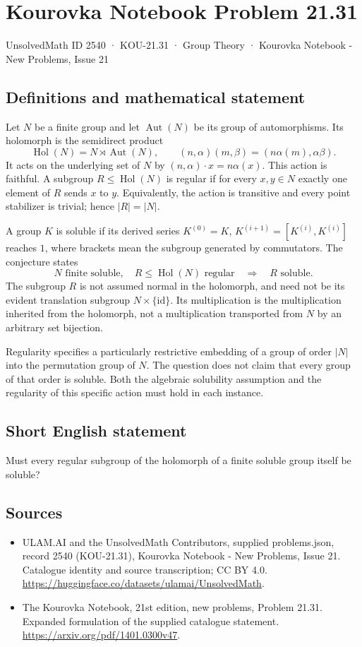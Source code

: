\documentclass[11pt,a4paper]{article}
\begin{document}
\section*{Kourovka Notebook Problem 21.31}\label{2540}
{\small UnsolvedMath ID 2540 · KOU-21.31 · Group Theory · Kourovka Notebook - New Problems, Issue 21}
\subsection{Definitions and mathematical statement}
Let $N$ be a finite group and let $\operatorname{Aut}(N)$ be its group
of automorphisms. Its holomorph is the semidirect product
\[
 \operatorname{Hol}(N)=N\rtimes\operatorname{Aut}(N),\qquad
 (n,\alpha)(m,\beta)=(n\alpha(m),\alpha\beta).
\]
It acts on the underlying set of $N$ by $(n,\alpha)\cdot x=n\alpha(x)$.
This action is faithful. A subgroup $R\le\operatorname{Hol}(N)$ is
regular if for every $x,y\in N$ exactly one element of $R$ sends $x$
to $y$. Equivalently, the action is transitive and every point stabilizer
is trivial; hence $|R|=|N|$.

A group $K$ is soluble if its derived series $K^{(0)}=K$,
$K^{(i+1)}=[K^{(i)},K^{(i)}]$ reaches $1$, where brackets mean the
subgroup generated by commutators.
The conjecture states
\[
 N\text{ finite soluble},\quad R\le\operatorname{Hol}(N)\text{ regular}
 \quad\Longrightarrow\quad R\text{ soluble}.
\]
The subgroup $R$ is not assumed normal in the holomorph, and need not
be its evident translation subgroup $N\times\{\mathrm{id}\}$.
Its multiplication is the multiplication inherited from the holomorph,
not a multiplication transported from $N$ by an arbitrary set bijection.

Regularity specifies a particularly restrictive embedding of a group of
order $|N|$ into the permutation group of $N$. The question does not
claim that every group of that order is soluble. Both the algebraic
solubility assumption and the regularity of this specific action must
hold in each instance.
\subsection{Short English statement}
Must every regular subgroup of the holomorph of a finite soluble group itself be soluble?
\subsection{Sources}
\begin{itemize}
\item[S1] ULAM.AI and the UnsolvedMath Contributors, supplied problems.json, record 2540 (KOU-21.31), Kourovka Notebook - New Problems, Issue 21. Catalogue identity and source transcription; CC BY 4.0.
\url{https://huggingface.co/datasets/ulamai/UnsolvedMath}.
\item[S2] The Kourovka Notebook, 21st edition, new problems, Problem 21.31. Expanded formulation of the supplied catalogue statement.
\url{https://arxiv.org/pdf/1401.0300v47}.
\end{itemize}
\end{document}

